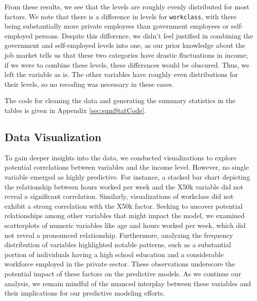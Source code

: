 \documentclass{article}
\begin{document}
	From these results, we see that the levels are roughly evenly distributed for most factors. We note that there is a difference in levels for \texttt{workclass}, with there being substantially more private employees than government employees or self-employed persons. Despite this difference, we didn't feel justified in combining the government and self-employed levels into one, as our prior knowledge about the job market tells us that these two categories have drastic fluctuations in income; if we were to combine these levels, these differences would be obscured. Thus, we left the variable as is. The other variables have roughly even distributions for their levels, so no recoding was necessary in these cases. \par
	
	The code for cleaning the data and generating the summary statistics in the tables is given in Appendix \ref{sec:sumStatCode}. 
	
	
    
    \subsection{Data Visualization}
    \hspace{\parindent} 

To gain deeper insights into the data, we conducted visualizations to explore potential correlations between variables and the income level. However, no single variable emerged as highly predictive. For instance, a stacked bar chart depicting the relationship between hours worked per week and the X50k variable did not reveal a significant correlation. Similarly, visualizations of workclass did not exhibit a strong correlation with the X50k factor. Seeking to uncover potential relationships among other variables that might impact the model, we examined scatterplots of numeric variables like age and hours worked per week, which did not reveal a pronounced relationship. Furthermore, analyzing the frequency distribution of variables highlighted notable patterns, such as a substantial portion of individuals having a high school education and a considerable workforce employed in the private sector. These observations underscore the potential impact of these factors on the predictive models. As we continue our analysis, we remain mindful of the nuanced interplay between these variables and their implications for our predictive modeling efforts.
\end{document}
